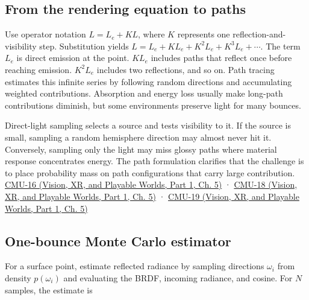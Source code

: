 \subsection{From the rendering equation to paths}\label{03-visual-computing-i-ch011-from-the-rendering-equation-to-paths}

\hypertarget{03-visual-computing-i-ch011-from-the-rendering-equation-to-paths}{}

Use operator notation \(L=L_e+KL\), where \(K\) represents one reflection-and-visibility step. Substitution yields \(L=L_e+KL_e+K^2L_e+K^3L_e+\cdots\). The term \(L_e\) is direct emission at the point. \(KL_e\) includes paths that reflect once before reaching emission. \(K^2L_e\) includes two reflections, and so on. Path tracing estimates this infinite series by following random directions and accumulating weighted contributions. Absorption and energy loss usually make long-path contributions diminish, but some environments preserve light for many bounces.

Direct-light sampling selects a source and tests visibility to it. If the source is small, sampling a random hemisphere direction may almost never hit it. Conversely, sampling only the light may miss glossy paths where material response concentrates energy. The path formulation clarifies that the challenge is to place probability mass on path configurations that carry large contribution. \href{../07-Vision-XR-and-Playable-Worlds-P01/main.pdf\#nameddest=04-visual-computing-ii-ch036-cmu-16---the-rendering-equation}{CMU-16 (Vision, XR, and Playable Worlds, Part 1, Ch. 5)} · \href{../07-Vision-XR-and-Playable-Worlds-P01/main.pdf\#nameddest=04-visual-computing-ii-ch036-cmu-18---monte-carlo-rendering}{CMU-18 (Vision, XR, and Playable Worlds, Part 1, Ch. 5)} · \href{../07-Vision-XR-and-Playable-Worlds-P01/main.pdf\#nameddest=04-visual-computing-ii-ch036-cmu-19---variance-reduction}{CMU-19 (Vision, XR, and Playable Worlds, Part 1, Ch. 5)}

\subsection{One-bounce Monte Carlo estimator}\label{03-visual-computing-i-ch011-one-bounce-monte-carlo-estimator}

\hypertarget{03-visual-computing-i-ch011-one-bounce-monte-carlo-estimator}{}

For a surface point, estimate reflected radiance by sampling directions \(\omega_i\) from density \(p(\omega_i)\) and evaluating the BRDF, incoming radiance, and cosine. For \(N\) samples, the estimate is

